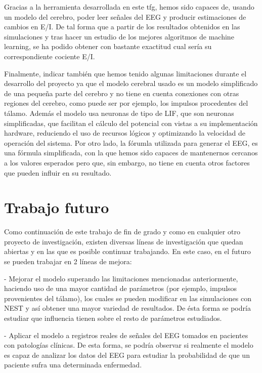 \documentclass[oneside,openright,titlepage,numbers=noenddot,openany,headinclude,footinclude=true,
cleardoublepage=empty,abstractoff,BCOR=5mm,paper=a4,fontsize=12pt,main=spanish]{scrreprt}
\begin{document}
Gracias a la herramienta desarrollada en este tfg, hemos sido capaces de, usando un modelo del cerebro, poder leer señales del EEG y producir estimaciones de cambios en E/I. De tal forma que a partir de los resultados obtenidos en las simulaciones y tras hacer un estudio de los mejores algoritmos de machine learning, se ha podido obtener con bastante exactitud cual sería su correspondiente cociente E/I.

Finalmente, indicar también que hemos tenido algunas limitaciones durante el desarrollo del proyecto ya que el modelo cerebral usado es un modelo simplificado de una pequeña parte del cerebro y no tiene en cuenta conexiones con otras regiones del cerebro, como puede ser por ejemplo, los impulsos procedentes del tálamo. Además el modelo usa neuronas de tipo de LIF, que son neuronas simplificadas, que facilitan el cálculo del potencial con vistas a su implementación hardware, reduciendo el uso de recursos lógicos y optimizando la velocidad de operación del sistema. Por otro lado, la fórumla utilizada para generar el EEG, es una fórmula simplificada, con la que hemos sido capaces de mantenernos cercanos a los valores esperados pero que, sin embargo, no tiene en cuenta otros factores que pueden influir en su resultado.

\chapter{Trabajo futuro}\label{part:futuro}

Como continuación de este trabajo de fin de grado y como en cualquier otro proyecto de investigación, existen diversas líneas de investigación que quedan abiertas y en las que es posible continuar trabajando. En este caso, en el futuro se pueden trabajar en 2 líneas de mejora:

- Mejorar el modelo superando las limitaciones mencionadas anteriormente, haciendo uso de una mayor cantidad de parámetros (por ejemplo, impulsos provenientes del tálamo), los cuales se pueden modificar en las simulaciones con NEST y así obtener una mayor variedad de resultados. De ésta forma se podría estudiar que influencia tienen sobre el resto de parámetros estudiados.

- Aplicar el modelo a registros reales de señales del EEG tomados en pacientes con patologías clínicas. De esta forma, se podría observar si realmente el modelo es capaz de analizar los datos del EEG para estudiar la probabilidad de que un paciente sufra una determinada enfermedad.






\ctparttext{\color{black}\begin{center}
\end{center}}



\end{document}
